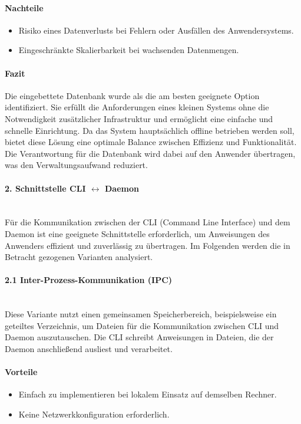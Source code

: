 \documentclass[a4paper,12pt]{report}
\begin{document}
    \paragraph*{Nachteile}
    \begin{itemize}
        \item Risiko eines Datenverlusts bei Fehlern oder Ausfällen des Anwendersystems.
        \item Eingeschränkte Skalierbarkeit bei wachsenden Datenmengen.
    \end{itemize}

    \paragraph*{Fazit}
    Die eingebettete Datenbank wurde als die am besten geeignete Option identifiziert.
    Sie erfüllt die Anforderungen eines kleinen Systems ohne die Notwendigkeit zusätzlicher Infrastruktur und ermöglicht eine einfache und schnelle Einrichtung.
    Da das System hauptsächlich offline betrieben werden soll, bietet diese Lösung eine optimale Balance zwischen Effizienz und Funktionalität.
    Die Verantwortung für die Datenbank wird dabei auf den Anwender übertragen, was den Verwaltungsaufwand reduziert.

    \paragraph*{2. Schnittstelle CLI $\leftrightarrow$ Daemon}\mbox{}\\
    Für die Kommunikation zwischen der CLI (Command Line Interface) und dem Daemon ist eine geeignete Schnittstelle erforderlich, um Anweisungen des Anwenders effizient und zuverlässig zu übertragen.
    Im Folgenden werden die in Betracht gezogenen Varianten analysiert.

    \paragraph*{2.1 Inter-Prozess-Kommunikation (IPC)}\mbox{}\\
    Diese Variante nutzt einen gemeinsamen Speicherbereich, beispielsweise ein geteiltes Verzeichnis, um Dateien für die Kommunikation zwischen CLI und Daemon auszutauschen.
    Die CLI schreibt Anweisungen in Dateien, die der Daemon anschließend ausliest und verarbeitet.

    \paragraph*{Vorteile}
    \begin{itemize}
        \item Einfach zu implementieren bei lokalem Einsatz auf demselben Rechner.
        \item Keine Netzwerkkonfiguration erforderlich.
    \end{itemize}
\end{document}
